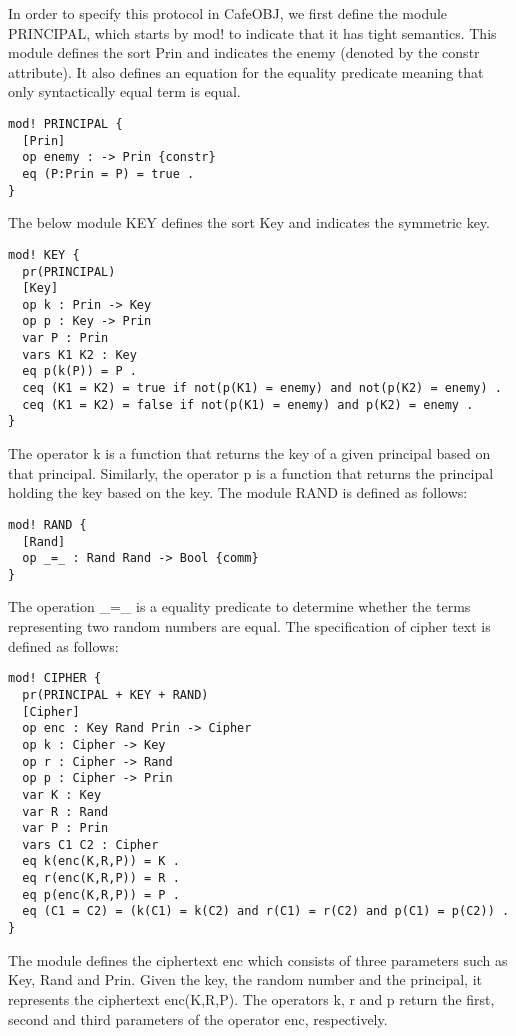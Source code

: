 \documentclass[a4paper,fleqn]{cas-dc}
\begin{document}
In order to specify this protocol in CafeOBJ, we first define the module PRINCIPAL, which starts by mod! to indicate that it has tight semantics. This module defines the sort Prin and indicates the enemy (denoted by the constr attribute). It also defines an equation for the equality predicate meaning that only syntactically equal term is equal.
\begin{small}
\begin{verbatim}
mod! PRINCIPAL {
  [Prin]
  op enemy : -> Prin {constr}
  eq (P:Prin = P) = true .
}
\end{verbatim}
\end{small}
The below module KEY defines the sort Key and indicates the symmetric key.
\begin{small}
\begin{verbatim}
mod! KEY {
  pr(PRINCIPAL)
  [Key]
  op k : Prin -> Key
  op p : Key -> Prin
  var P : Prin
  vars K1 K2 : Key
  eq p(k(P)) = P .
  ceq (K1 = K2) = true if not(p(K1) = enemy) and not(p(K2) = enemy) .
  ceq (K1 = K2) = false if not(p(K1) = enemy) and p(K2) = enemy .
}
\end{verbatim}
\end{small}
The operator k is a function that returns the key of a given principal based on that principal. Similarly, the operator p is a function that returns the principal holding the key based on the key.
The module RAND is defined as follows:
\begin{small}
\begin{verbatim}
mod! RAND {
  [Rand]
  op _=_ : Rand Rand -> Bool {comm}
}
\end{verbatim}
\end{small}
The operation \_=\_ is a equality predicate to determine whether the terms representing two random numbers are equal.
The specification of cipher text is defined as follows:
\begin{small}
\begin{verbatim}
mod! CIPHER {
  pr(PRINCIPAL + KEY + RAND)
  [Cipher]
  op enc : Key Rand Prin -> Cipher
  op k : Cipher -> Key
  op r : Cipher -> Rand
  op p : Cipher -> Prin
  var K : Key
  var R : Rand
  var P : Prin
  vars C1 C2 : Cipher
  eq k(enc(K,R,P)) = K .
  eq r(enc(K,R,P)) = R .
  eq p(enc(K,R,P)) = P .
  eq (C1 = C2) = (k(C1) = k(C2) and r(C1) = r(C2) and p(C1) = p(C2)) .
}
\end{verbatim}
\end{small}
The module defines the ciphertext enc which consists of three parameters such as Key, Rand and Prin. Given the key, the random number and the principal, it represents the ciphertext enc(K,R,P). The operators k, r and p return the first, second and third parameters of the operator enc, respectively.
\end{document}
